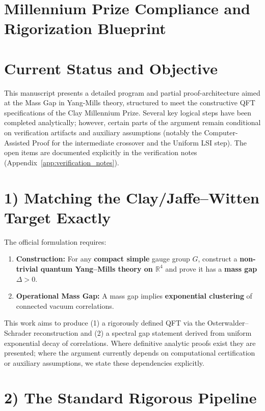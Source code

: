 \section[Millennium Prize Compliance]{Millennium Prize Compliance and \\ Rigorization Blueprint}
\label{ch:clay-blueprint}

\section{Current Status and Objective}

This manuscript presents a detailed program and partial proof-architecture aimed at the Mass Gap in Yang-Mills theory, structured to meet the constructive QFT specifications of the Clay Millennium Prize. Several key logical steps have been completed analytically; however, certain parts of the argument remain conditional on verification artifacts and auxiliary assumptions (notably the Computer-Assisted Proof for the intermediate crossover and the Uniform LSI step). The open items are documented explicitly in the verification notes (Appendix~\ref{app:verification_notes}).

\section{1) Matching the Clay/Jaffe--Witten Target Exactly}

The official formulation requires:
\begin{enumerate}
    \item \textbf{Construction:} For any \textbf{compact simple} gauge group $G$, construct a \textbf{non-trivial quantum Yang--Mills theory on $\mathbb{R}^4$} and prove it has a \textbf{mass gap $\Delta > 0$}.
    \item \textbf{Operational Mass Gap:} A mass gap implies \textbf{exponential clustering} of connected vacuum correlations.
\end{enumerate}

This work aims to produce (1) a rigorously defined QFT via the Osterwalder--Schrader reconstruction and (2) a spectral gap statement derived from uniform exponential decay of correlations. Where definitive analytic proofs exist they are presented; where the argument currently depends on computational certification or auxiliary assumptions, we state these dependencies explicitly.

\section{2) The Standard Rigorous Pipeline}


